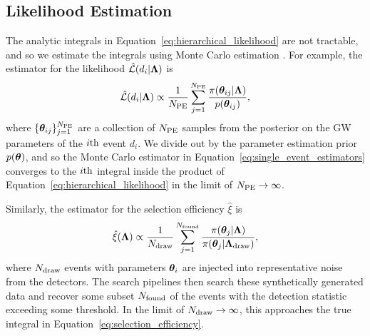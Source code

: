
\subsection{Likelihood Estimation}
\label{sec:likelihood-estimator-variance}

The analytic integrals in Equation~\eqref{eq:hierarchical_likelihood} are not tractable, and so we estimate the integrals using Monte Carlo estimation \citep{Tiwari:2017ndi, Farr:2019rap, Essick:2022ojx, Talbot:2023pex}. 
For example, the estimator for the likelihood $\hat{\mathcal{L}}(d_i|\boldsymbol{\Lambda})$ is
\begin{equation}
    \hat{\mathcal{L}}(d_i|\boldsymbol{\Lambda}) \propto \frac{1}{N_{\rm PE}} \sum_{j=1}^{N_{\rm PE}} \frac{\pi(\boldsymbol{\theta}_{ij}|\boldsymbol{\Lambda})}{p(\boldsymbol{\theta}_{ij})},
    \label{eq:single_event_estimators}
\end{equation}
where $\{\boldsymbol{\theta}_{ij}\}_{j=1}^{N_{\rm PE}}$ are a collection of $N_{\rm PE}$ samples from the posterior on the \ac{GW} parameters of the $i{\rm th}$ event $d_i$. 
We divide out by the parameter estimation prior $p(\boldsymbol{\theta})$, and so
the Monte Carlo estimator in Equation~\eqref{eq:single_event_estimators} converges to the $i{\rm th}$ integral inside the product of Equation~\eqref{eq:hierarchical_likelihood} in the limit of $N_{\rm PE} \to \infty$.

Similarly, the estimator for the selection efficiency $\hat{\xi}$ is \citep{Tiwari:2017ndi, Farr:2019rap, Essick:2022ojx}
\begin{equation}
    \hat{\xi}(\boldsymbol{\Lambda}) \propto \frac{1}{N_{\rm draw}} \sum_{j=1}^{N_{\rm found}} \frac{\pi(\boldsymbol{\theta}_{j}|\boldsymbol{\Lambda})}{\pi(\boldsymbol{\theta}_{j}|\boldsymbol{\Lambda}_{\rm draw})},
    \label{eq:selection_estimator}
\end{equation}
where $N_{\rm draw}$ events with parameters $\boldsymbol{\theta}_i$ are injected into representative noise from the detectors. 
The search pipelines then search these synthetically generated data and recover some subset $N_{\rm found}$ of the events with the detection statistic exceeding some threshold.
In the limit of $N_{\rm draw} \to \infty$, this approaches the true integral in Equation~\eqref{eq:selection_efficiency}.

